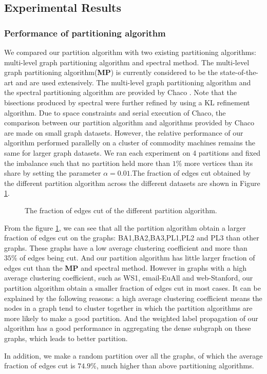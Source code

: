 \documentclass{acm_proc_article-sp}
\begin{document}
\subsection{Experimental Results}
\subsubsection{Performance of partitioning algorithm}
We compared our partition algorithm with two existing partitioning algorithms: multi-level graph partitioning algorithm and spectral method.
The multi-level graph partitioning algorithm(\textbf{MP}) is currently considered to be the state-of-the-art and are used extensively. The multi-level graph partitioning algorithm and the spectral partitioning algorithm are provided by Chaco \cite{Hendrickson_Leland_1994}. Note that the bisections produced by spectral were further refined by using a KL refinement algorithm. Due to space constraints and serial execution of Chaco, the comparison between our partition algorithm and algorithms provided by Chaco are made on small graph datasets. However, the relative performance of our algorithm performed parallelly on a cluster of commodity machines remains the same for larger graph datasets. We ran each experiment on 4 partitions and fixed the imbalance such that no partition held more than $1\%$ more vertices than its share by setting the parameter $\alpha=0.01$.The fraction of edges cut obtained by the different partition algorithm across the different datasets  are shown in Figure \ref{fig:per}.
\begin{figure}
\centering
{}
\caption{The fraction of edges cut of the different partition algorithm.}
\label{fig:per}
\end{figure}
\par
From the figure \ref{fig:per}, we can see that all the partition algorithm obtain a larger fraction of edges cut on the graphs: BA1,BA2,BA3,PL1,PL2 and PL3 than other graphs. These graphs have a low average clustering coefficient and more than $35\%$ of edges being cut. And our partition algorithm has little larger fraction of edges cut than the \textbf{MP} and spectral method. However in graphs with a high average clustering coefficient, such as WS1, email-EuAll and web-Stanford, our partition algorithm obtain a smaller fraction of edges cut in most cases. It can be explained by the following reasons: a high average clustering coefficient means the nodes in a graph tend to cluster together in which the partition algorithms are more likely to make a good partition. And the weighted label propagation of our algorithm has a good performance in aggregating the dense subgraph on these graphs, which leads to better partition.
\par
In addition, we make a random partition over all the graphs, of which the average fraction of edges cut is $74.9\%$, much higher than above partitioning algorithms.
\end{document}
